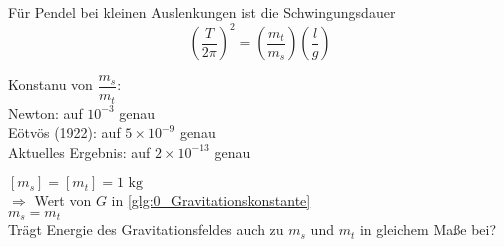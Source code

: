 \documentclass[a4paper, 11pt]{article}
\numberwithin{equation}{section}
\begin{document}
Für Pendel bei kleinen Auslenkungen ist die Schwingungsdauer
\begin{equation*}
\left(\dfrac{T}{2 \pi} \right)^2 = \left(\dfrac{m_t}{m_s} \right) \left( \dfrac{l}{g} \right)
\end{equation*}

Konstanu von $\dfrac{m_s}{m_t}$:\\
Newton: auf $10^{-3}$ genau\\
Eötvös (1922): auf $ 5 \times 10^{-9}$ genau\\
Aktuelles Ergebnis: auf $2 \times 10^{-13}$ genau


$[m_s] = [m_t] = 1 \text{ kg}$\\
$\Rightarrow$ Wert von $G$ in \ref{glg:0_Gravitationskonstante}\\
$m_s = m_t$\\
Trägt Energie des Gravitationsfeldes auch zu $m_s$ und $m_t$ in gleichem Maße bei?
\end{document}

